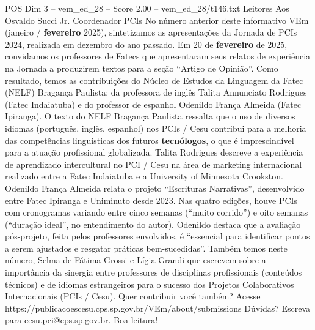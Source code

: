 \begin{textsample}{POS Dim 3 – vem\_ed\_28 – Score 2.00 – vem\_ed\_28/t146.txt}  \label{ex:f3_pos_027}
Leitores Aos Osvaldo Succi Jr.
Coordenador PCIs No número anterior deste informativo VEm (janeiro / \textbf{fevereiro} 2025), sintetizamos as apresentações da Jornada de PCIs 2024, realizada em dezembro do ano passado.
Em 20 de \textbf{fevereiro} de 2025, convidamos os professores de Fatecs que apresentaram seus relatos de experiência na Jornada a produzirem textos para a seção “Artigo de Opinião”.
Como resultado, temos as contribuições do Núcleo de Estudos da Linguagem da Fatec (NELF) Bragança Paulista; da professora de inglês Talita Annunciato Rodrigues (Fatec Indaiatuba) e do professor de espanhol Odenildo França Almeida (Fatec Ipiranga).
O texto do NELF Bragança Paulista ressalta que o uso de diversos idiomas (português, inglês, espanhol) nos PCIs / Cesu contribui para a melhoria das competências linguísticas dos futuros \textbf{tecnólogos}, o que é imprescindível para a atuação profissional globalizada.
Talita Rodrigues descreve a experiência de aprendizado intercultural no PCI / Cesu na área de marketing internacional realizado entre a Fatec Indaiatuba e a University of Minnesota Crookston.
Odenildo França Almeida relata o projeto “Escrituras Narrativas”, desenvolvido entre Fatec Ipiranga e Uniminuto desde 2023.
Nas quatro edições, houve PCIs com cronogramas variando entre cinco semanas (“muito corrido”) e oito semanas (“duração ideal”, no entendimento do autor).
Odenildo destaca que a avaliação pós-projeto, feita pelos professores envolvidos, é “essencial para identificar pontos a serem ajustados e resgatar práticas bem-sucedidas”.
Também temos neste número, Selma de Fátima Grossi e Lígia Grandi que escrevem sobre a importância da sinergia entre professores de disciplinas profissionais (conteúdos técnicos) e de idiomas estrangeiros para o sucesso dos Projetos Colaborativos Internacionais (PCIs / Cesu).
Quer contribuir você também?
Acesse https://publicacoescesu.cps.sp.gov.br/VEm/about/submissions Dúvidas?
Escreva para cesu.pci@cps.sp.gov.br.
Boa leitura!

\end{textsample}
